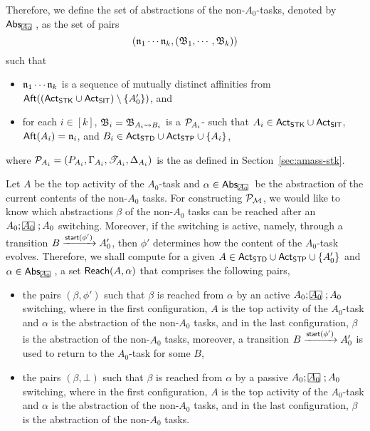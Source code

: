 Therefore, we define the set of abstractions of the non-$A_0$-tasks, denoted by $\abs_{\mhcancel{A_0}}$, as the set of pairs 
\[(\mathfrak{n}_1 \cdots \mathfrak{n}_k, ({\mathfrak{B} }_1, \cdots, {\mathfrak{B} }_k))\]
such that 
\begin{itemize}
\item $\mathfrak{n}_1 \cdots \mathfrak{n}_k$ is a sequence of mutually distinct affinities from ${\sf Aft}(({\sf Act}_{{\sf STK}} \cup {\sf Act}_{{\sf SIT}}) \setminus \{A'_0\})$, and 
\item for each $i \in [k]$, ${\mathfrak{B} }_i = {\mathfrak{B} }_{A_i \rightsquigarrow B_i}$ is a ${\mathcal{P} }_{A_i}$-{\WOTrNFA} such that $A_i \in {\sf Act}_{\sf STK} \cup {\sf Act}_{\sf SIT}$, ${\sf Aft}(A_i) = \mathfrak{n}_i$, and $B_i \in {\sf Act}_{\sf STD} \cup {\sf Act}_{\sf STP} \cup \{A_i\}$, 
\end{itemize}
where ${\mathcal{P} }_{A_i} = (P_{A_i}, \Gamma_{A_i}, {\mathscr{T} }_{A_i}, \Delta_{A_i})$ is the {\WOTrPDS} as defined in Section~\ref{sec:amass-stk}.

Let $A$ be the top activity of the $A_0$-task and $\alpha \in \abs_{\mhcancel{A_0}}$ be the abstraction of the current contents of the non-$A_0$ tasks. For constructing ${\mathcal{P} }_{{\mathcal{M} }}$, we would like to know which abstractions $\beta$ of the non-$A_0$ tasks can be reached after an $A_0;\mhcancel{A_0};A_0$ switching. Moreover, if the switching is active, namely, through a transition $B \xrightarrow{{\mathsf{start} }(\phi')} A'_0$, then $\phi'$ determines how the content of the $A_0$-task evolves. Therefore, we shall compute for a given $A \in {\sf Act}_{\sf STD} \cup {\sf Act}_{\sf STP} \cup \{A'_0\}$ and $\alpha \in \abs_{\mhcancel{A_0}}$, a set ${\sf Reach}(A, \alpha)$ that comprises the following pairs, 
\begin{itemize}
\item the pairs $(\beta, \phi')$ such that $\beta$ is reached from $\alpha$ by an active $A_0;\mhcancel{A_0};A_0$ switching, where in the first configuration, $A$ is the top activity of the $A_0$-task and $\alpha$ is the abstraction of the non-$A_0$ tasks, and in the last configuration, $\beta$ is the abstraction of the non-$A_0$ tasks, moreover, a transition $B \xrightarrow{{\mathsf{start} }(\phi')} A'_0$ is used to return to the $A_0$-task for some $B$,  
%
\item the pairs $(\beta, \bot)$ such that $\beta$ is reached from $\alpha$ by a passive $A_0;\mhcancel{A_0};A_0$ switching, where in the first configuration, $A$ is the top activity of the $A_0$-task and $\alpha$ is the abstraction of the non-$A_0$ tasks, and in the last configuration, $\beta$ is the abstraction of the non-$A_0$ tasks. 
\end{itemize}


